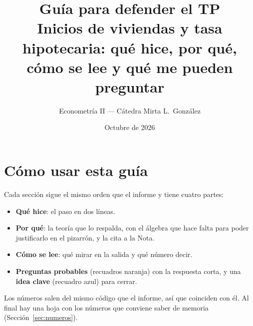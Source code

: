 \documentclass[11pt,a4paper]{article}
\title{\textbf{Gu\'ia para defender el TP}\\[2pt]\large Inicios de viviendas y tasa hipotecaria: qu\'e hice, por qu\'e, c\'omo se lee y qu\'e me pueden preguntar}
\author{Econometr\'ia II --- C\'atedra Mirta L.\ Gonz\'alez}
\date{Octubre de 2026}
\begin{document}
\maketitle
\tableofcontents
\newpage

\section{C\'omo usar esta gu\'ia}
Cada secci\'on sigue el mismo orden que el informe y tiene cuatro partes:
\begin{itemize}
\item \textbf{Qu\'e hice}: el paso en dos l\'ineas.
\item \textbf{Por qu\'e}: la teor\'ia que lo respalda, con el \'algebra que hace falta para poder justificarlo en el pizarr\'on, y la cita a la Nota.
\item \textbf{C\'omo se lee}: qu\'e mirar en la salida y qu\'e n\'umero decir.
\item \textbf{Preguntas probables} (recuadros naranja) con la respuesta corta, y una \textbf{idea clave} (recuadro azul) para cerrar.
\end{itemize}
Los n\'umeros salen del mismo c\'odigo que el informe, as\'i que coinciden con \'el. Al final hay una hoja con los n\'umeros que conviene saber de memoria (Secci\'on~\ref{sec:numeros}).

\end{document}
